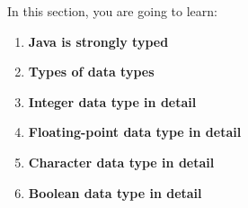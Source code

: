 \setlength{\columnsep}{3pt}
\begin{flushleft}
	\bigskip
	\bigskip
	\begin{tcolorbox}[breakable,notitle,boxrule=1pt,colback=black,colframe=black]
		\color{white}
		\bigskip
		In this section, you are going to learn:
		\begin{enumerate}
			\item \textbf{Java is strongly typed}
			\item \textbf{Types of data types}
			\item \textbf{Integer data type in detail}
			\item \textbf{Floating-point data type in detail}
			\item \textbf{Character data type in detail}
			\item \textbf{Boolean data type in detail}
		\end{enumerate}	

	\end{tcolorbox}
	
\end{flushleft}

\newpage





